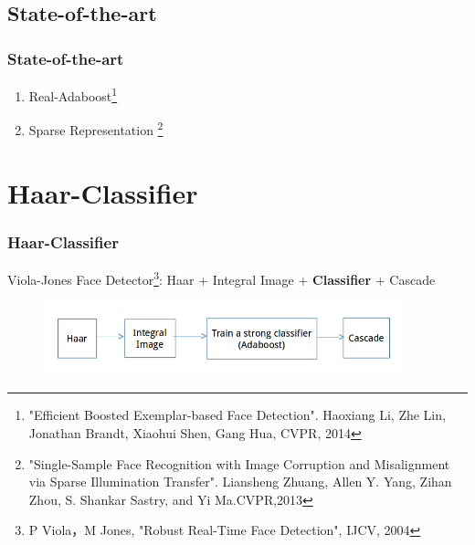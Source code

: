 \documentclass[10pt]{beamer}
\begin{document}
\subsection{State-of-the-art}
\begin{frame}
    \frametitle{State-of-the-art}
    \begin{enumerate}
   \item Real-Adaboost\footnote{ "Efficient Boosted Exemplar-based Face Detection". Haoxiang Li, Zhe Lin, Jonathan Brandt, Xiaohui Shen, Gang Hua, CVPR, 2014}\\
   \item Sparse Representation \footnote{"Single-Sample Face Recognition with Image Corruption and Misalignment via Sparse Illumination Transfer". Liansheng Zhuang, Allen Y. Yang, Zihan Zhou, S. Shankar Sastry, and Yi Ma.CVPR,2013}
   \end{enumerate} 
\end{frame}

\section{Haar-Classifier}
\begin{frame}
    \frametitle{Haar-Classifier}   
   Viola-Jones Face Detector\footnote{P Viola，M Jones, "Robust Real-Time Face Detection", IJCV, 2004}: \newline
 Haar + Integral Image + \textbf{Classifier} + Cascade  \newline
   \begin{figure}[!ht]
   \centering
   \includegraphics[width=4.1in]{detector.png}
   \end{figure}
\end{frame}
\end{document}
